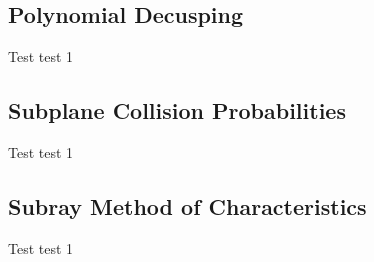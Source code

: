 \subsection{Polynomial Decusping}
\begin{frame}[t]{Test}
    test 1
\end{frame}

\subsection{Subplane Collision Probabilities}
\begin{frame}[t]{Test}
    test 1
\end{frame}

\subsection{Subray Method of Characteristics}
\begin{frame}[t]{Test}
    test 1
\end{frame}